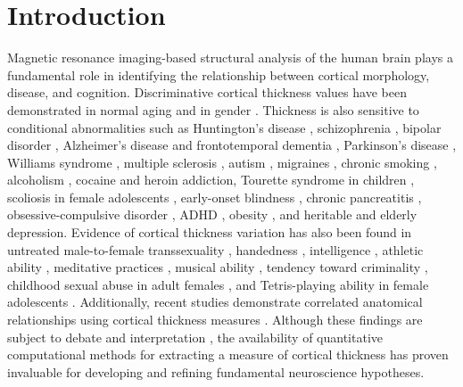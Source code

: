\section{Introduction}

Magnetic resonance imaging-based 
structural analysis of the human brain plays a fundamental role
in identifying the relationship between cortical morphology, disease, and cognition.
Discriminative cortical thickness values 
have been demonstrated in normal aging \citep{Lemaitre2012,Chen2011,kochunov2011,Walhovd2013} and in gender \citep{amunts2007,luders2006a}.
Thickness is also sensitive to conditional abnormalities such as
Huntington's disease \citep{rosas2002,rosas2005,selemon2004}, 
schizophrenia \citep{nesvag2008}, bipolar disorder \citep{lyoo2006}, Alzheimer's disease and frontotemporal
dementia \citep{du2007,dickerson2009}, Parkinson's disease \citep{jubault2011}, Williams syndrome \citep{thompson2005},
multiple sclerosis \citep{ramasamy2009}, autism \citep{chung2005,hardan2006},
migraines \citep{dasilva2007}, chronic smoking \citep{kuhn2010}, alcoholism \citep{fortier2011},
cocaine \citep{makris2008} and heroin \citep{li2014} addiction, Tourette syndrome in children \citep{sowell2008},
scoliosis in
female adolescents \citep{wang2012}, 
early-onset blindness \citep{jiang2009},
chronic pancreatitis \citep{frokjaer2012},
obsessive-compulsive disorder \citep{shin2007}, ADHD \citep{almeida-montes2012}, obesity \citep{raji2010}, 
and heritable \citep{peterson2009}
and elderly \citep{ballmaier2004} depression.  Evidence of cortical thickness 
variation has also been found in untreated
male-to-female transsexuality \citep{luders2012},  handedness
\citep{luders2006,amunts2007}, intelligence \citep{shaw2006}, athletic
ability \citep{wei2011}, meditative practices \citep{lazar2005}, musical ability \citep{bermudez2009,foster2010}, 
tendency toward criminality \citep{raine2011}, 
childhood sexual abuse in adult females \citep{heim2013},
and Tetris-playing
ability in female adolescents \citep{haier2009}.  Additionally,
recent studies demonstrate correlated anatomical
relationships using cortical thickness measures
\citep{worsley2005,lerch2006,he2007,chen2008}.
Although these findings
are subject to debate and interpretation \citep{gernsbacher2007}, 
the availability of quantitative
computational methods for extracting a measure of cortical thickness
has proven invaluable for developing and refining fundamental 
neuroscience hypotheses.

